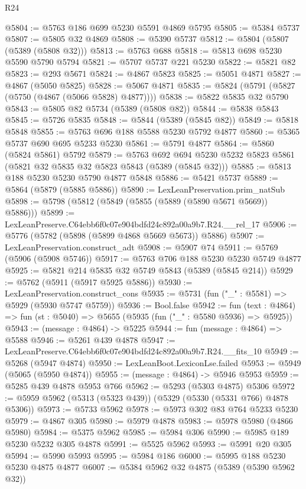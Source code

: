\begin{lexlean}{R24}
\begin{coremodule}
@5804 := @5763 @186 @699 @5230 @5591 @4869 @5795
@5805 := @5384 @5737
@5807 := @5805 @32 @4869
@5808 := @5390 @5737
@5812 := @5804 (@5807 (@5389 (@5808 @32)))
@5813 := @5763 @688
@5818 := @5813 @698 @5230 @5590 @5790 @5794
@5821 := @5707 @5737 @221 @5230
@5822 := @5821 @82
@5823 := @293 @5671
@5824 := @4867 @5823
@5825 := @5051 @4871
@5827 := @4867 (@5050 @5825)
@5828 := @5067 @4871
@5835 := @5824 (@5791 (@5827 (@5750 (@4867 (@5066 @5828) @4877))))
@5838 := @5822 @5835 @32 @5790
@5843 := @5805 @82 @5734 (@5389 (@5808 @82))
@5844 := @5838 @5843
@5845 := @5726 @5835
@5848 := @5844 (@5389 (@5845 @82))
@5849 := @5818 @5848
@5855 := @5763 @696 @188 @5588 @5230 @5792 @4877
@5860 := @5365 @5737 @690 @695 @5233 @5230
@5861 := @5791 @4877
@5864 := @5860 (@5824 @5861) @5792
@5879 := @5763
    @692
    @694
    @5230
    @5232
    @5823
    @5861
    (@5821 @32 @5835 @32 @5823 @5843 (@5389 (@5845 @32)))
@5885 := @5813 @188 @5230 @5230 @5790 @4877 @5848
@5886 := @5421 @5737
@5889 := @5864 (@5879 (@5885 @5886))
@5890 := LexLeanPreservation.prim_natSub
@5898 := @5798 (@5812 (@5849 (@5855 (@5889 (@5890 @5671 @5669)) @5886)))
@5899 := LexLeanPreserve.C64ebb6f0c07e904bdfd24c892a00a9b7.R24.__rel_17
@5906 := @5776 (@5782 (@5898 (@5899 @4868 @5669 @5673)) @5886)
@5907 := LexLeanPreservation.construct_adt
@5908 := @5907 @74
@5911 := @5769 (@5906 (@5908 @5746))
@5917 := @5763 @706 @188 @5230 @5230 @5749 @4877
@5925 := @5821 @214 @5835 @32 @5749 @5843 (@5389 (@5845 @214))
@5929 := @5762 (@5911 (@5917 @5925 @5886))
@5930 := LexLeanPreservation.construct_cons
@5935 := @5731 (fun ("_" : @5581) => @5929 (@5930 @5747 @5759))
@5936 := Bool.false
@5942 := fun (text : @4864) => fun (st : @5040) => @5655 (@5935 (fun ("_" : @5580 @5936) => @5925))
@5943 := (message : @4864) -> @5225
@5944 := fun (message : @4864) => @5588
@5946 := @5261 @439 @4878
@5947 := LexLeanPreserve.C64ebb6f0c07e904bdfd24c892a00a9b7.R24.__fits_10
@5949 := @5268 (@5947 @4874)
@5950 := LexLeanBoot.LexiconLse.failed
@5953 := @5949 (@5065 (@5950 @4874))
@5955 := (message : @4864) -> @5946 @5953
@5959 := @5285 @439 @4878 @5953 @766
@5962 := @5293 (@5303 @4875) @5306
@5972 := @5959 @5962 (@5313 (@5323 @439)) (@5329 (@5330 (@5331 @766) @4878 @5306))
@5973 := @5733 @5962
@5978 := @5973 @302 @83 @764 @5233 @5230
@5979 := @4867 @305
@5980 := @5979 @4878
@5983 := @5978 @5980 (@4866 @5980)
@5984 := @5375 @5962
@5985 := @5984 @306
@5990 := @5985 @189 @5230 @5232 @305 @4878
@5991 := @5525 @5962
@5993 := @5991 @20 @305
@5994 := @5990 @5993
@5995 := @5984 @186
@6000 := @5995 @188 @5230 @5230 @4875 @4877
@6007 := @5384 @5962 @32 @4875 (@5389 (@5390 @5962 @32))

\end{coremodule}
\end{lexlean}
